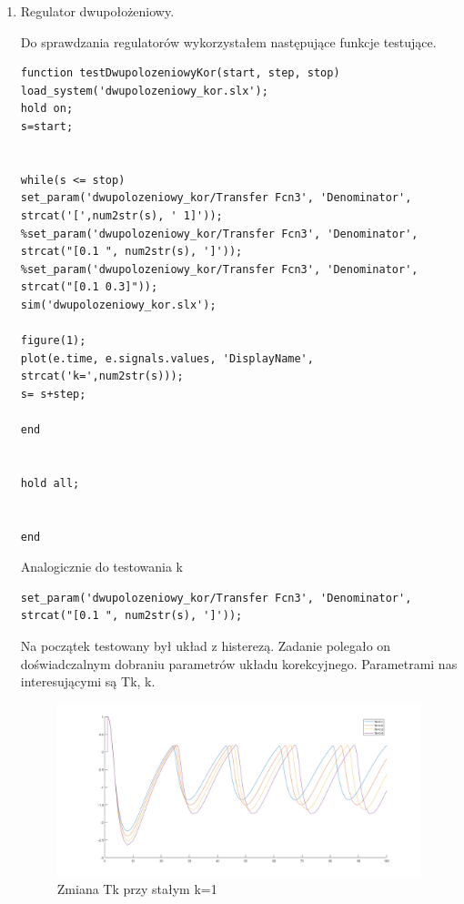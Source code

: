 \documentclass[a4paper,10pt]{article}
\begin{document}
\begin{enumerate}
		\item Regulator dwupołożeniowy.
		
		Do sprawdzania regulatorów wykorzystałem następujące funkcje testujące.
		
\begin{lstlisting}[caption=Funkcja testująca regulator dwupoziomowy z korekcją zmiana T.]
function testDwupolozeniowyKor(start, step, stop)
load_system('dwupolozeniowy_kor.slx');
hold on;
s=start;


while(s <= stop)
set_param('dwupolozeniowy_kor/Transfer Fcn3', 'Denominator', strcat('[',num2str(s), ' 1]'));
%set_param('dwupolozeniowy_kor/Transfer Fcn3', 'Denominator', strcat("[0.1 ", num2str(s), ']'));
%set_param('dwupolozeniowy_kor/Transfer Fcn3', 'Denominator', strcat("[0.1 0.3]"));
sim('dwupolozeniowy_kor.slx');

figure(1);
plot(e.time, e.signals.values, 'DisplayName', strcat('k=',num2str(s)));
s= s+step;

end


hold all;


end
\end{lstlisting}

Analogicznie do testowania k

\begin{lstlisting}[caption=set param dla k.]
set_param('dwupolozeniowy_kor/Transfer Fcn3', 'Denominator', strcat("[0.1 ", num2str(s), ']'));
\end{lstlisting}
\newpage

Na początek testowany był układ z histerezą. Zadanie polegało on doświadczalnym dobraniu parametrów układu korekcyjnego.
Parametrami nas interesującymi są Tk, k.

\begin{figure}[!h]
    \centering
	\includegraphics[width=120mm]{dwu_kor_tk.png}
	\caption{Zmiana Tk przy stałym k=1}
    \label{fig:Rysunek}
\end{figure}


\end{enumerate}
\end{document}
